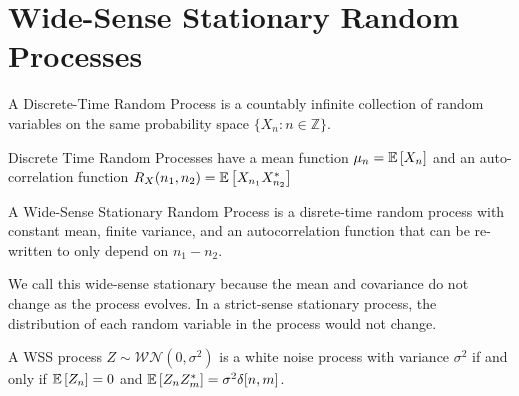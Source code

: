 \section{Wide-Sense Stationary Random Processes}
\begin{definition}
	A Discrete-Time Random Process is a countably infinite collection of random variables on the same probability space $\{X_n: n\in\mathbb{Z}\}$.
	\label{defn:discrete-time-rp}
\end{definition}
Discrete Time Random Processes have a mean function $\mu_n = \mathbb{E}\left[X_n\right]$ and an auto-correlation function $R_X(n_1, n_2) = \mathbb{E}\left[X_{n_1}X_{n_2}^*\right]$
\begin{definition}
	A Wide-Sense Stationary Random Process is a disrete-time random process with constant mean, finite variance, and an autocorrelation function that can be re-written to only depend on $n_1-n_2$.
	\label{defn:wss-process}
\end{definition}
We call this wide-sense stationary because the mean and covariance do not change as the process evolves.
In a strict-sense stationary process, the distribution of each random variable in the process would not change.
\begin{definition}
	A WSS process $Z\sim \mathcal{WN}(0, \sigma^2)$ is a white noise process with variance $\sigma^2$ if and only if $\mathbb{E}\left[Z_n\right] = 0$ and $\mathbb{E}\left[Z_nZ_m^*\right] = \sigma^2\delta[n, m]$.
	\label{defn:white-noise-process}
\end{definition}
